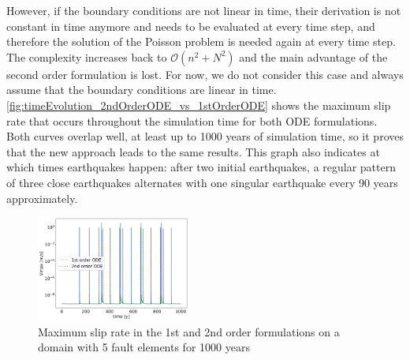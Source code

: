 However, if the boundary conditions are not linear in time, their derivation is not constant in time anymore and needs to be evaluated at every time step, and therefore the solution of the Poisson problem is needed again at every time step. The complexity increases back to $\mathcal{O}\left(n^2+N^2\right)$ and the main advantage of the second order formulation is lost. For now, we do not consider this case and always assume that the boundary conditions are linear in time.  \\
\autoref{fig:timeEvolution_2ndOrderODE_vs_1stOrderODE} shows the maximum slip rate that occurs throughout the simulation time for both ODE formulations. Both curves overlap well, at least up to 1000 years of simulation time, so it proves that the new approach leads to the same results. This graph also indicates at which times earthquakes happen: after two initial earthquakes, a regular pattern of three close earthquakes alternates with one singular earthquake every 90 years approximately.
\begin{figure}[H]
	\centering
	\includegraphics[width=0.45\textwidth]{images/TANDEMtimeEvolutionVExtendedODE1stvs2ndOrder.png}
	\caption{Maximum slip rate in the 1st and 2nd order formulations on a domain with 5 fault elements for 1000 years} 
	\label{fig:timeEvolution_2ndOrderODE_vs_1stOrderODE}
\end{figure}


